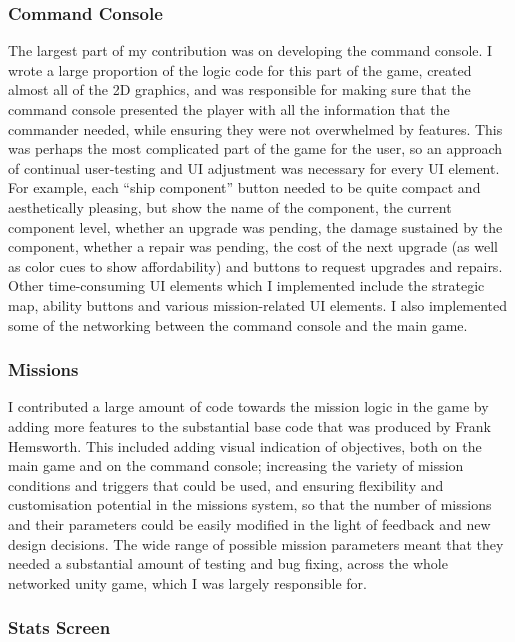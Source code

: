 \documentclass[a4paper,11pt]{article}
\begin{document}
\subsubsection{Command Console}

The largest part of my contribution was on developing the command console. I wrote a large proportion of the logic code for this part of the game, created almost all of the 2D graphics, and was responsible for making sure that the command console presented the player with all the information that the commander needed, while ensuring they were not overwhelmed by features. This was perhaps the most complicated part of the game for the user, so an approach of continual user-testing and UI adjustment was necessary for every UI element. For example, each “ship component” button needed to be quite compact and aesthetically pleasing, but show the name of the component, the current component level, whether an upgrade was pending, the damage sustained by the component, whether a repair was pending, the cost of the next upgrade (as well as color cues to show affordability) and buttons to request upgrades and repairs. Other time-consuming UI elements which I implemented include the strategic map, ability buttons and various mission-related UI elements. I also implemented some of the networking between the command console and the main game.

\subsubsection{Missions}

I contributed a large amount of code towards the mission logic in the game by adding more features to the substantial base code that was produced by Frank Hemsworth. This included adding visual indication of objectives, both on the main game and on the command console; increasing the variety of mission conditions and triggers that could be used, and ensuring flexibility and customisation potential in the missions system, so that the number of missions and their parameters could be easily modified in the light of feedback and new design decisions. The wide range of possible mission parameters meant that they needed a substantial amount of testing and bug fixing, across the whole networked unity game, which I was largely responsible for.

\subsubsection{Stats Screen}
\end{document}
